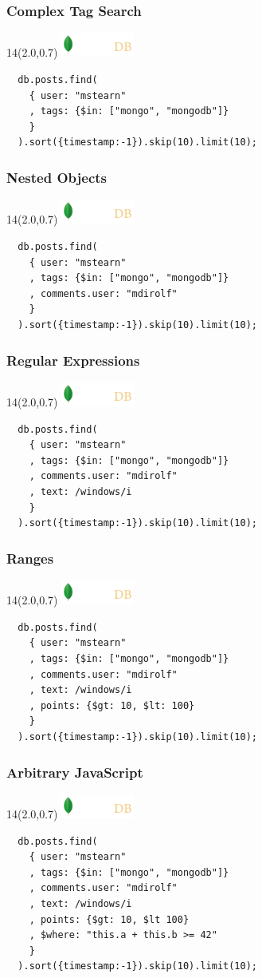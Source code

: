 \documentclass{beamer}
\newcommand{\MongoLogo}{
\begin{textblock}{14}(2.0,0.7)
  \includegraphics[height=0.8cm]{logo-mongodb-ondark.png}
\end{textblock}
}
\begin{document}
\begin{frame}[fragile]
  \frametitle{Complex Tag Search}
  \MongoLogo

  \begin{verbatim}
  db.posts.find(
    { user: "mstearn"
    , tags: {$in: ["mongo", "mongodb"]}
    }
  ).sort({timestamp:-1}).skip(10).limit(10);
  \end{verbatim}
  
\end{frame}

\begin{frame}[fragile]
  \frametitle{Nested Objects}
  \MongoLogo

  \begin{verbatim}
  db.posts.find(
    { user: "mstearn"
    , tags: {$in: ["mongo", "mongodb"]}
    , comments.user: "mdirolf"
    }
  ).sort({timestamp:-1}).skip(10).limit(10);
  \end{verbatim}
  
\end{frame}
\begin{frame}[fragile]
  \frametitle{Regular Expressions}
  \MongoLogo

  \begin{verbatim}
  db.posts.find(
    { user: "mstearn"
    , tags: {$in: ["mongo", "mongodb"]}
    , comments.user: "mdirolf"
    , text: /windows/i
    }
  ).sort({timestamp:-1}).skip(10).limit(10);
  \end{verbatim}
  
\end{frame}
\begin{frame}[fragile]
  \frametitle{Ranges}
  \MongoLogo

  \begin{verbatim}
  db.posts.find(
    { user: "mstearn"
    , tags: {$in: ["mongo", "mongodb"]}
    , comments.user: "mdirolf"
    , text: /windows/i
    , points: {$gt: 10, $lt: 100}
    }
  ).sort({timestamp:-1}).skip(10).limit(10);
  \end{verbatim}
  
\end{frame}
\begin{frame}[fragile]
  \frametitle{Arbitrary JavaScript}
  \MongoLogo

  \begin{verbatim}
  db.posts.find(
    { user: "mstearn"
    , tags: {$in: ["mongo", "mongodb"]}
    , comments.user: "mdirolf"
    , text: /windows/i
    , points: {$gt: 10, $lt 100}
    , $where: "this.a + this.b >= 42"
    }
  ).sort({timestamp:-1}).skip(10).limit(10);
  \end{verbatim}
\end{frame}
\end{document}
